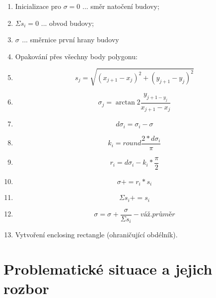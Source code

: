 \documentclass[oneside,12pt,a4paper]{book}
\begin{document}
\begin{enumerate}
\item Inicializace pro $\sigma = 0$ ... směr natočení budovy;
\item \quad \quad \quad $\Sigma s_i = 0$ ... obvod budovy;
\item \quad \quad \quad $\sigma_{}$ ... směrnice první hrany budovy 
\item Opakování přes všechny body polygonu:
\item \quad \begin{equation}
    s_j = \sqrt{(x_{j+1}-x_j)^2 + (y_{j+1}-y_j)^2}
\end{equation}
\item \quad \begin{equation}
    \sigma_j = \arctan2 \frac{y_{j+1-y_j}}{x_{j+1}-x_j}
\end{equation}
\item \quad \begin{equation}
    d \sigma_i= \sigma_i-\sigma
\end{equation}
\item \quad \begin{equation}
    k_i=round \frac{2*d \sigma_i}{\pi}
\end{equation}
\item \quad \begin{equation}
    r_i=d \sigma_i - k_i*\frac{\pi}{2}
\end{equation}
\item \quad \begin{equation}
    \sigma+=r_i*s_i
\end{equation}
\item \quad \begin{equation}
    \Sigma s_i+=s_i
\end{equation}
\item \begin{equation}
    \sigma = \sigma_{}+\frac{\sigma}{\Sigma s_i}-\textit{váž.průměr}
\end{equation}
\item Vytvoření enclosing rectangle (ohraničující obdélník).
\end{enumerate}

\bigskip

\chapter{Problematické situace a jejich rozbor} 
\end{document}
